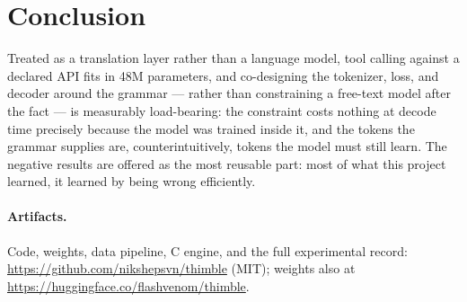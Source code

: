\documentclass[10pt]{article}
\begin{document}
\section{Conclusion}

Treated as a translation layer rather than a language model, tool calling
against a declared API fits in 48M parameters, and co-designing the tokenizer,
loss, and decoder around the grammar --- rather than constraining a free-text
model after the fact --- is measurably load-bearing: the constraint costs
nothing at decode time precisely because the model was trained inside it, and
the tokens the grammar supplies are, counterintuitively, tokens the model must
still learn. The negative results are offered as the most reusable part: most
of what this project learned, it learned by being wrong efficiently.

\paragraph{Artifacts.} Code, weights, data pipeline, C engine, and the full
experimental record: \url{https://github.com/nikshepsvn/thimble} (MIT);
weights also at \url{https://huggingface.co/flashvenom/thimble}.



\end{document}
